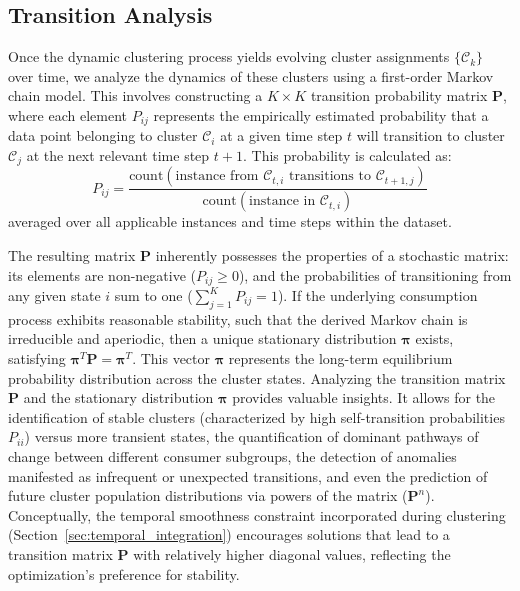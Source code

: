 \documentclass[final,authoryear,3p,times,review,sort&compress]{elsarticle}
\newcommand{\matr}[1]{\mathbf{#1}}
\newcommand{\set}[1]{\mathcal{#1}}
\begin{document}
\subsection{Transition Analysis}
\label{sec:transition_analysis_method}
Once the dynamic clustering process yields evolving cluster assignments $\{\set{C}_k\}$ over time, we analyze the dynamics of these clusters using a first-order Markov chain model. This involves constructing a $K \times K$ transition probability matrix $\matr{P}$, where each element $P_{ij}$ represents the empirically estimated probability that a data point belonging to cluster $\set{C}_i$ at a given time step $t$ will transition to cluster $\set{C}_j$ at the next relevant time step $t+1$. This probability is calculated as:
\begin{equation}
    P_{ij} = \frac{\text{count}(\text{instance from } \set{C}_{t,i} \text{ transitions to } \set{C}_{t+1,j})}{\text{count}(\text{instance in } \set{C}_{t,i})}
\end{equation}
averaged over all applicable instances and time steps within the dataset.

The resulting matrix $\matr{P}$ inherently possesses the properties of a stochastic matrix: its elements are non-negative ($P_{ij} \geq 0$), and the probabilities of transitioning from any given state $i$ sum to one ($\sum_{j=1}^K P_{ij} = 1$). If the underlying consumption process exhibits reasonable stability, such that the derived Markov chain is irreducible and aperiodic, then a unique stationary distribution $\boldsymbol{\pi}$ exists, satisfying $\boldsymbol{\pi}^T\matr{P} = \boldsymbol{\pi}^T$. This vector $\boldsymbol{\pi}$ represents the long-term equilibrium probability distribution across the cluster states. Analyzing the transition matrix $\matr{P}$ and the stationary distribution $\boldsymbol{\pi}$ provides valuable insights. It allows for the identification of stable clusters (characterized by high self-transition probabilities $P_{ii}$) versus more transient states, the quantification of dominant pathways of change between different consumer subgroups, the detection of anomalies manifested as infrequent or unexpected transitions, and even the prediction of future cluster population distributions via powers of the matrix ($\matr{P}^n$). Conceptually, the temporal smoothness constraint incorporated during clustering (Section~\ref{sec:temporal_integration}) encourages solutions that lead to a transition matrix $\matr{P}$ with relatively higher diagonal values, reflecting the optimization's preference for stability.
\end{document}
